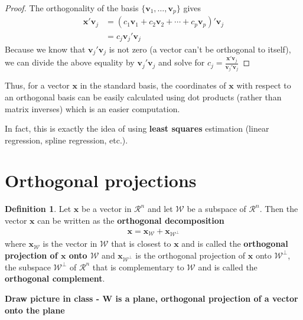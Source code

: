 \documentclass[
]{book}
\theoremstyle{definition}
\newtheorem{definition}{Definition}[chapter]
\theoremstyle{definition}
\theoremstyle{definition}
\theoremstyle{definition}
\theoremstyle{remark}
\begin{document}
\begin{proof}
The orthogonality of the basis \(\{ \mathbf{v}_1, \ldots, \mathbf{v}_p \}\) gives
\[
\begin{aligned}
\mathbf{x}'\mathbf{v}_j & = \left(c_1 \mathbf{v}_1 + c_2 \mathbf{v}_2 + \cdots + c_p \mathbf{v}_p \right)' \mathbf{v}_j \\
& = c_j \mathbf{v}_j' \mathbf{v}_j
\end{aligned}
\]
Because we know that \(\mathbf{v}_j'\mathbf{v}_j\) is not zero (a vector can't be orthogonal to itself), we can divide the above equality by \(\mathbf{v}_j' \mathbf{v}_j\) and solve for \(c_j = \frac{\mathbf{x}'\mathbf{v}_j}{\mathbf{v}_j'\mathbf{v}_j}\)
\end{proof}

Thus, for a vector \(\mathbf{x}\) in the standard basis, the coordinates of \(\mathbf{x}\) with respect to an orthogonal basis can be easily calculated using dot products (rather than matrix inverses) which is an easier computation.

In fact, this is exactly the idea of using \textbf{least squares} estimation (linear regression, spline regression, etc.).

\hypertarget{orthogonal-projections}{%
\section{Orthogonal projections}\label{orthogonal-projections}}

\begin{definition}
Let \(\mathbf{x}\) be a vector in \(\mathcal{R}^n\) and let \(\mathcal{W}\) be a subspace of \(\mathcal{R}^n\). Then the vector \(\mathbf{x}\) can be written as the \textbf{orthogonal decomposition}
\[
\begin{aligned}
\mathbf{x} = \mathbf{x}_{\mathcal{W}} + \mathbf{x}_{\mathcal{W}^\perp}
\end{aligned}
\]
where \(\mathbf{x}_{\mathcal{W}}\) is the vector in \(\mathcal{W}\) that is closest to \(\mathbf{x}\) and is called the \textbf{orthogonal projection of \(\mathbf{x}\) onto \(\mathcal{W}\)} and \(\mathbf{x}_{\mathcal{W}^\perp}\) is the orthogonal projection of \(\mathbf{x}\) onto \(\mathcal{W}^{\perp}\), the subspace \(\mathcal{W}^\perp\) of \(\mathcal{R}^n\) that is complementary to \(\mathcal{W}\) and is called the \textbf{orthogonal complement}.
\end{definition}

\textbf{Draw picture in class - W is a plane, orthogonal projection of a vector onto the plane}
\end{document}
